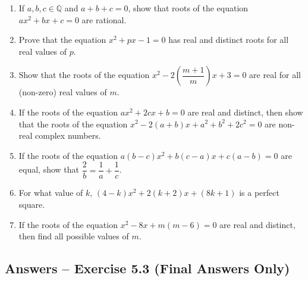 \documentclass[12pt,a4paper]{article}
\begin{document}
\begin{enumerate}
    \item If \( a, b, c \in \mathbb{Q} \) and \( a + b + c = 0 \), show that roots of the equation \( ax^2 + bx + c = 0 \) are rational.

    \item Prove that the equation \( x^2 + px - 1 = 0 \) has real and distinct roots for all real values of \( p \).

    \item Show that the roots of the equation \( x^2 - 2\left( \dfrac{m+1}{m} \right)x + 3 = 0 \) are real for all (non-zero) real values of \( m \).

    \item If the roots of the equation \( ax^2 + 2cx + b = 0 \) are real and distinct, then show that the roots of the equation \( x^2 - 2(a + b)x + a^2 + b^2 + 2c^2 = 0 \) are non-real complex numbers.

    \item If the roots of the equation \( a(b - c)x^2 + b(c - a)x + c(a - b) = 0 \) are equal, show that \( \dfrac{2}{b} = \dfrac{1}{a} + \dfrac{1}{c} \).

    \item For what value of \( k \), \( (4 - k)x^2 + 2(k + 2)x + (8k + 1) \) is a perfect square.

    \item If the roots of the equation \( x^2 - 8x + m(m - 6) = 0 \) are real and distinct, then find all possible values of \( m \).
\end{enumerate}

\subsection{Answers -- Exercise 5.3 (Final Answers Only)}
\end{document}
